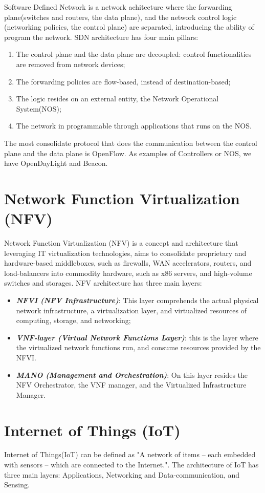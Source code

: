 Software Defined Network\cite{sdn-survey} is a network achitecture where the forwarding plane(switches and routers, the data plane), and the network control logic (networking policies, the control plane) are separated, introducing the ability of program the network.  SDN architecture has four main pillars:
\begin{enumerate}[label=\roman*]
    \item The control plane and the data plane are decoupled: control functionalities are removed from network devices;
    \item The forwarding policies are flow-based, instead of destination-based; 
    \item The logic resides on an external entity, the Network Operational System(NOS);
    \item The network in programmable through applications that runs on the NOS.
\end{enumerate}
The most consolidate protocol that does the communication between the control plane and the data plane is OpenFlow. As examples of Controllers or NOS, we have OpenDayLight and Beacon. 


\section{Network Function Virtualization (NFV)}

Network Function Virtualization (NFV)\cite{nfv-survey} is a concept and architecture that leveraging IT virtualization technologies, aims to consolidate proprietary and hardware-based middleboxes, such as firewalls, WAN accelerators, routers, and load-balancers into commodity hardware, such as x86 servers, and high-volume switches and storages. NFV architecture has three main layers:
\begin{itemize}
    \item \textit{\textbf{NFVI (NFV Infrastructure)}}: This layer comprehends the actual physical network infrastructure, a virtualization layer, and virtualized resources of computing, storage, and networking;
    \item \textit{\textbf{VNF-layer (Virtual Network Functions Layer)}}: this is the layer where the virtualized network functions run, and consume resources provided by the NFVI.
    \item \textit{\textbf{MANO (Management and Orchestration)}}: On this layer resides the NFV Orchestrator, the VNF manager, and the Virtualized Infrastructure Manager. 
\end{itemize}


\section{Internet of Things (IoT)}


Internet of Things(IoT)\cite{iot-ieee} can be defined as "A network of items -- each embedded with sensors -- which are connected to the Internet."\cite{iot-ieee}. The architecture of IoT has three main layers: Applications, Networking and Data-communication, and Sensing. 





